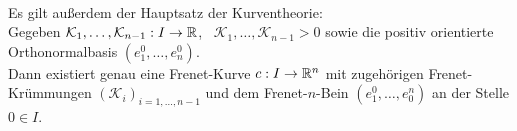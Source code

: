 \begin{defs}
\begin{align}
\end{align}
Es gilt außerdem der Hauptsatz der Kurventheorie: \\
Gegeben $\mathcal{K}_1,\dots,\mathcal{K}_{n-1}: I \rightarrow \mathbb{R}$, \ $\mathcal{K}_1,\dots,\mathcal{K}_{n-1} > 0 $ sowie die positiv orientierte Orthonormalbasis $\left(e_1^0,\dots,e_n^0\right)$. \\
Dann existiert genau eine Frenet-Kurve $c: I\rightarrow \mathbb{R}^n$ mit zugehörigen Frenet-Krümmungen $(\mathcal{K}_i)_{i=1,\dots,n-1}$ und dem Frenet-$n$-Bein $(e_1^0,\dots,e_0^n)$ an der Stelle $0 \in I$.
\end{defs}